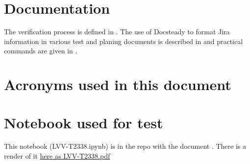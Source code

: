 

\newpage
\appendix
\section{Documentation}
The verification process is defined in .
The use of Docsteady to format Jira information in various test and planing documents is
described in  and practical commands are given in .

\section{Acronyms used in this document}\label{sec:acronyms}


\newpage



\section{Notebook used for test }
This notebook (LVV-T2338.ipynb) is in the repo with the document .
There is a render of it \href{https://dmtr-331.lsst.io/LVV-T2338.pdf}{here as LVV-T2338.pdf}
